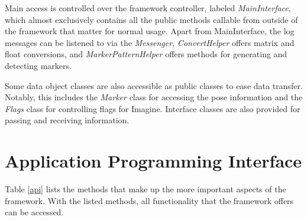 Main access is controlled over the framework controller, labeled \textit{MainInterface}, which almost exclusively contains all the public methods callable from outside of the framework that matter for normal usage.
Apart from MainInterface, the log messages can be listened to via the \textit{Messenger}, \textit{ConvertHelper} offers matrix and float conversions, and \textit{MarkerPatternHelper} offers methods for generating and detecting markers.

Some data object classes are also accessible as public classes to ease data transfer.
Notably, this includes the \textit{Marker} class for accessing the pose information and the \textit{Flags} class for controlling flags for Imagine.
Interface classes are also provided for passing and receiving information.

\section{Application Programming Interface}

Table \ref{api} lists the methods that make up the more important aspects of the framework.
With the listed methods, all functionality that the framework offers can be accessed.

